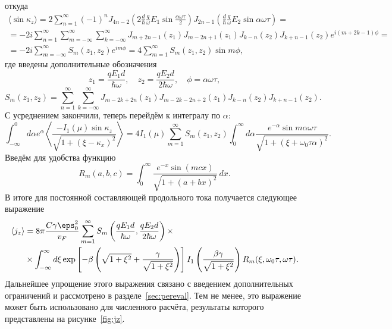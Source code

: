 откуда
\begin{gather*}
   \langle\sin\kappa_z\rangle =
  2\sum_{n=1}^\infty (-1)^n
  J_{4n-2}\left(2\frac{d}{\hbar}\frac{q}{\omega}E_1\sin\frac{\alpha\omega\tau}{2}\right)
  J_{2n-1}\left(\frac{d}{\hbar}\frac{q}{\omega}E_2\sin\alpha\omega\tau\right)
  =\\=
  -2i\sum_{n=1}^\infty\sum_{m=-\infty}^\infty\sum_{k=-\infty}^\infty
   J_{m+2n-1}(z_1)J_{m-2n+1}(z_1)J_{k-n}(z_2)J_{k+n-1}(z_2)e^{i(m+2k-1)\phi}=\\=
   -2i\sum_{m=-\infty}^\infty S_{m}(z_1,z_2) e^{im\phi} = 4\sum_{m=1}^\infty
   S_m(z_1,z_2)\sin m\phi,
\end{gather*}
где введены дополнительные обозначения
\begin{equation*}
    z_1 = \frac{qE_1d}{\hbar\omega},\quad
    z_2 = \frac{qE_2d}{2\hbar\omega},\quad
    \phi = \alpha\omega\tau,
\end{equation*}
\begin{equation*}
    S_m(z_1,z_2) = \sum_{n=1}^\infty\sum_{k=-\infty}^\infty
   J_{m-2k+2n}(z_1)J_{m-2k-2n+2}(z_1)J_{k-n}(z_2)J_{k+n-1}(z_2).
\end{equation*}
С усреднением закончили, теперь перейдём к интегралу по \(\alpha\):
\begin{equation*}
    \int_{-\infty}^{0}d \alpha
    e^\alpha\left\langle\frac{-I_1(\mu)\sin\kappa_z}{\sqrt{1+(\xi-\kappa_x)^2}}\right\rangle
    = 4I_1(\mu) \sum_{m=1}^\infty S_m(z_1,z_2) \int_0^\infty d \alpha
    \frac{e^{-\alpha}\sin m\alpha\omega\tau}{\sqrt{1+\left(\xi+\omega_0\tau\alpha\right)^2}}.
\end{equation*}
Введём для удобства функцию
\begin{equation*}
    R_m(a,b,c) = \int_0^\infty \frac{e^{-x}\sin
    (mcx)}{\sqrt{1+\left(a+bx\right)^2}}\,dx.
\end{equation*}
В итоге для постоянной составляющей продольного тока получается следующее выражение
\begin{align*}
    \langle j_z \rangle &= 8\pi \frac{C\gamma\eps_0^2}{v_F}\sum_{m=1}^\infty
    S_m\left(\frac{qE_1d}{\hbar\omega},\frac{qE_2d}{2\hbar\omega}\right)\times\\&\times
    \int_{-\infty}^\infty d\xi \exp\left[-\beta\left(\sqrt{1+\xi^2} +
    \frac{\gamma}{\sqrt{1+\xi^2}}\right)\right]
    I_1\left(\frac{\beta\gamma}{\sqrt{1+\xi^2}}\right) R_m(\xi, \omega_0\tau,
    \omega\tau).
\end{align*}
Дальнейшее упрощение этого выражения связано с введением дополнительных ограничений и рассмотрено в разделе~\ref{sec:pereval}. Тем не менее, это выражение может быть использовано для численного расчёта, результаты которого представлены на рисунке~\ref{fig:jz}.
